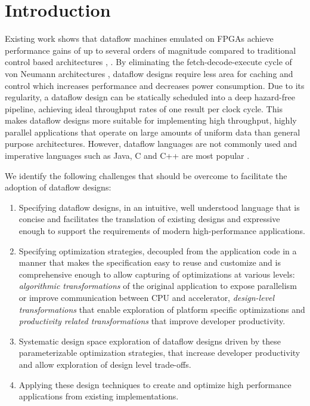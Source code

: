 \section{Introduction}

Existing work shows that dataflow machines emulated on FPGAs achieve
performance gains of up to several orders of magnitude compared to
traditional control based architectures \cite{Flynn:Pell:Mencer:2012},
\cite{Mencer:2012}. By eliminating the fetch-decode-execute cycle of
von Neumann architectures \cite{Neumann:1993}, dataflow designs
require less area for caching and control which increases performance
and decreases power consumption. Due to its regularity, a dataflow
design can be statically scheduled into a deep hazard-free pipeline,
achieving ideal throughput rates of one result per clock cycle. This
makes dataflow designs more suitable for implementing high throughput,
highly parallel applications that operate on large amounts of uniform
data than general purpose architectures. However, dataflow languages
are not commonly used and imperative languages such as Java, C and C++
are most popular \cite{Tiobe:2012}.

We identify the following challenges that should be overcome to
facilitate the adoption of dataflow designs:
\begin{enumerate}
\item Specifying dataflow designs, in an intuitive, well understood
  language that is concise and facilitates the translation of existing
  designs and expressive enough to support the requirements of modern
  high-performance applications.
\item Specifying optimization strategies, decoupled from the
  application code in a manner that makes the specification easy to
  reuse and customize and is comprehensive enough to allow capturing
  of optimizations at various levels: \emph{algorithmic
    transformations} of the original application to expose parallelism
  or improve communication between CPU and accelerator,
  \emph{design-level transformations} that enable exploration of
  platform specific optimizations and \emph{productivity related
    transformations} that improve developer productivity.
\item Systematic design space exploration of dataflow designs driven
  by these parameterizable optimization strategies, that increase
  developer productivity and allow exploration of design level
  trade-offs.
\item Applying these design techniques to create and optimize high
  performance applications from existing implementations.
\end{enumerate}

